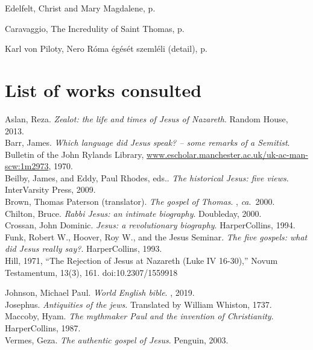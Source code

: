 \documentclass[10pt,twoside]{article} %
\newcommand{\artcredit}[3]{#2, #3, p.~\pageref{fig:#1}}
\begin{document}
\artcredit{resurrection-mary-magdalene}{Edelfelt}{Christ and Mary Magdalene}

\artcredit{doubting-thomas}{Caravaggio}{The Incredulity of Saint Thomas}

\artcredit{nero}{Karl von Piloty}{Nero Róma égését szemléli (detail)}

\vfill\pagebreak\section*{List of works consulted}

\newcommand{\refbook}[4]{#1. \emph{#2}. #3, #4.\\} %

\refbook{Aslan, Reza}{Zealot: the life and times of Jesus of Nazareth}{Random House}{2013}

\refbook{Barr, James}{Which language did Jesus speak? -- some remarks of a Semitist}{Bulletin of the John Rylands Library,
\url{www.escholar.manchester.ac.uk/uk-ac-man-scw:1m2973}}{1970}

\refbook{Beilby, James, and Eddy, Paul Rhodes, eds.}{The historical Jesus: five views}{InterVarsity Press}{2009}

\refbook{Brown, Thomas Paterson (translator)}{The gospel of Thomas}{}{\emph{ca}.~2000}

\refbook{Chilton, Bruce}{Rabbi Jesus: an intimate biography}{Doubleday}{2000}


\refbook{Crossan, John Dominic}{Jesus: a revolutionary biography}{HarperCollins}{1994}

\refbook{Funk, Robert W., Hoover, Roy W., and the Jesus Seminar}{The five gospels: what did Jesus really say?}{HarperCollins}{1993}

Hill, 1971, ``The Rejection of Jesus at Nazareth (Luke IV 16-30),'' Novum Testamentum, 13(3), 161. doi:10.2307/1559918 

\refbook{Johnson, Michael Paul}{World English bible}{}{2019}

\refbook{Josephus}{Antiquities of the jews}{Translated by William Whiston}{1737}

\refbook{Maccoby, Hyam}{The mythmaker Paul and the invention of Christianity}{HarperCollins}{1987}

\refbook{Vermes, Geza}{The authentic gospel of Jesus}{Penguin}{2003}

\vfill\pagebreak\printindex

\vfill\pagebreak\printindex[texts]
\end{document}
